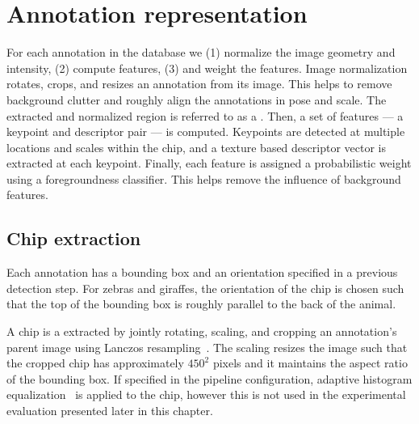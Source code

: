 \begin{comment}
    ./texfix.py --fpaths main.tex --outline --asmarkdown --numlines=999 -w --ignoreinputstartswith=def,Crall,header,colordef,figdef
    ./texfix.py --fpaths sec-3-1-annotrepr.tex --outline --asmarkdown --numlines=999  -w
\end{comment}


\section{Annotation representation}\label{sec:annotrepr}
  
    For each annotation in the database we
    (1) normalize the image geometry and intensity,
    (2) compute features,
    (3) and weight the features.
    Image normalization rotates, crops, and resizes an annotation from
      its image.
    This helps to remove background clutter and roughly align the
      annotations in pose and scale.
    The extracted and normalized region is referred to as a
      .
    Then, a set of features ---  a keypoint and descriptor pair --- is
      computed.
    Keypoints are detected at multiple locations and scales within the
      chip, and a texture based descriptor vector is extracted at each
      keypoint.
    Finally, each feature is assigned a probabilistic weight using a
      foregroundness classifier.
    This helps remove the influence of background features.

    \subsection{Chip extraction}

        Each annotation has a bounding box and an orientation specified
          in a previous detection step.
        For zebras and giraffes, the orientation of the chip is chosen
          such that the top of the bounding box is roughly parallel to
          the back of the animal.

        A chip is a extracted by jointly rotating, scaling, and
          cropping an annotation's parent image using Lanczos
          resampling~\cite{lanczos_applied_1988}.
        The scaling resizes the image such that the cropped chip has
          approximately $450^2$ pixels and it maintains the aspect ratio
          of the bounding box.
        If specified in the pipeline configuration, adaptive histogram
          equalization~\cite{pizer_adaptive_1987} is applied to the chip,
          however this is not used in the experimental evaluation
          presented later in this chapter.


